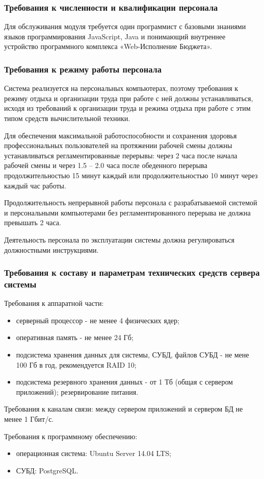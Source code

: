 \documentclass[a4paper]{extarticle}
\begin{document}
\subsubsection{Требования к численности и квалификации персонала}
Для обслуживания модуля требуется один программист с базовыми знаниями языков программирования JavaScript, Java и понимающий внутреннее устройство программного комплекса «Web-Исполнение Бюджета».

\subsubsection{Требования к режиму работы персонала}
Система реализуется на персональных компьютерах, поэтому требования к режиму отдыха и организации труда при работе с ней должны устанавливаться, исходя из требований к организации труда и режима отдыха при работе с этим типом средств вычислительной техники.\par
Для обеспечения максимальной работоспособности и сохранения здоровья профессиональных пользователей на протяжении рабочей смены должны устанавливаться регламентированные перерывы: через 2 часа после начала рабочей смены и через 1.5 – 2.0 часа после обеденного перерыва продолжительностью 15 минут каждый или продолжительностью 10 минут через каждый час работы.\par
Продолжительность непрерывной работы персонала с разрабатываемой системой и персональными компьютерами без регламентированного перерыва не должна превышать 2 часа.\par
Деятельность персонала по эксплуатации системы должна регулироваться должностными инструкциями.

\subsubsection{Требования к составу и параметрам технических средств сервера системы}
Требования к аппаратной части:\par
\begin{itemize}
  \item серверный процессор - не менее 4 физических ядер;
  \item оперативная память - не менее 24 Гб;
  \item подсистема хранения данных для системы, СУБД, файлов СУБД - не мене 100 Гб в год, рекомендуется RAID 10;
  \item подсистема резервного хранения данных - от 1 Тб (общая с сервером приложений); резервирование питания.
\end{itemize}\par
Требования к каналам связи: между сервером приложений и сервером БД не менее 1 Гбит/с.\par
Требования к программному обеспечению:\par
\begin{itemize}
  \item операционная система: Ubuntu Server 14.04 LTS;
  \item СУБД: PostgreSQL.
\end{itemize}\par
\end{document}
